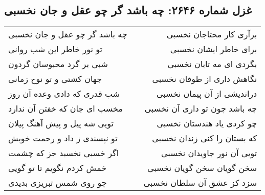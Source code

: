 \begin{center}
\section*{غزل شماره ۲۶۴۶: چه باشد گر چو عقل و جان نخسبی}
\label{sec:2646}
\begin{longtable}{l p{0.5cm} r}
چه باشد گر چو عقل و جان نخسبی
&&
برآری کار محتاجان نخسبی
\\
تو نور خاطر این شب روانی
&&
برای خاطر ایشان نخسبی
\\
شبی بر گرد محبوسان گردون
&&
بگردی ای مه تابان نخسبی
\\
جهان کشتی و تو نوح زمانی
&&
نگاهش داری از طوفان نخسبی
\\
شب قدری که دادی وعده آن روز
&&
دراندیشی از آن پیمان نخسبی
\\
مخسب ای جان که خفتن آن ندارد
&&
چه باشد چون تو داری آن نخسبی
\\
تویی شه پیل و پیش آهنگ پیلان
&&
چو کردی یاد هندستان نخسبی
\\
تو نپسندی ز داد و رحمت خویش
&&
که بستان را کنی زندان نخسبی
\\
اگر خسبی نخسبد جز که چشمت
&&
تویی آن نور جاویدان نخسبی
\\
خمش کردم نگویم تا تو گویی
&&
سخن گویان سخن گویان نخسبی
\\
چو روی شمس تبریزی بدیدی
&&
سزد کز عشق آن سلطان نخسبی
\\
\end{longtable}
\end{center}
